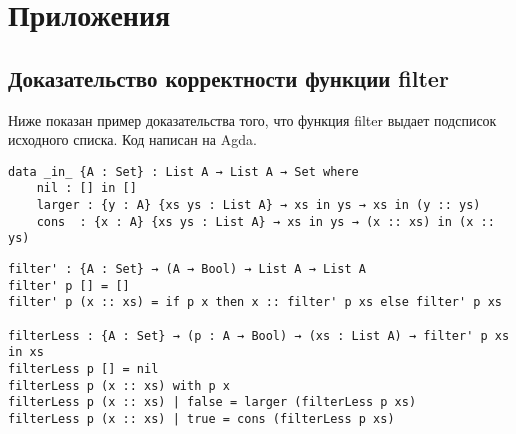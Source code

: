 \appendix
\section*{Приложения}
\renewcommand{\thesubsection}{\Alph{subsection}}

\subsection{Доказательство корректности функции filter}\label{sort_proof}

Ниже показан пример доказательства того, что функция filter выдает подсписок исходного списка.
Код написан на Agda\cite{agda}.

\begin{lstlisting}[caption={Определяем предикат означающий "список xs является подсписком ys"},captionpos=b]
data _in_ {A : Set} : List A → List A → Set where
    nil : [] in []
    larger : {y : A} {xs ys : List A} → xs in ys → xs in (y :: ys)
    cons  : {x : A} {xs ys : List A} → xs in ys → (x :: xs) in (x :: ys)
\end{lstlisting}


\begin{lstlisting}[caption={Докажем, что filter xs подсписок xs для любого списка xs},captionpos=b]
filter' : {A : Set} → (A → Bool) → List A → List A
filter' p [] = []
filter' p (x :: xs) = if p x then x :: filter' p xs else filter' p xs

filterLess : {A : Set} → (p : A → Bool) → (xs : List A) → filter' p xs in xs
filterLess p [] = nil
filterLess p (x :: xs) with p x
filterLess p (x :: xs) | false = larger (filterLess p xs)
filterLess p (x :: xs) | true = cons (filterLess p xs)
\end{lstlisting}

